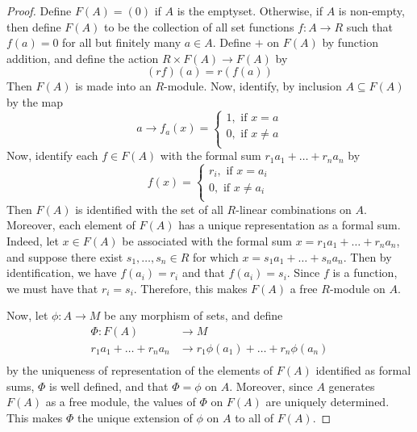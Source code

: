 \begin{proof}
  Define $F(A)=(0)$ if $A$ is the emptyset. Otherwise, if $A$ is
  non-empty, then define $F(A)$ to be the collection of all set
  functions $f:A \xrightarrow{} R$ such that $f(a)=0$ for all but
  finitely many $a \in A$. Define $+$ on $F(A)$ by function addition,
  and define the action $R \times F(A) \xrightarrow{} F(A)$ by
  \begin{equation*}
    (rf)(a)=r(f(a))
  \end{equation*}
  Then $F(A)$ is made into an $R$-module. Now, identify, by inclusion
  $A \subseteq F(A)$ by the map
  \begin{equation*}
    a \xrightarrow{} f_a(x)=
    \begin{cases}
      1, \text{ if } x=a  \\
      0, \text{ if } x \neq a \\
    \end{cases}
  \end{equation*}
  Now, identify each $f \in F(A)$ with the formal sum
  $r_1a_1+\dots+r_na_n$ by
  \begin{equation*}
    f(x)=
    \begin{cases}
      r_i, \text{ if } x=a_i  \\
      0 , \text{ if } x \neq a_i  \\
    \end{cases}
  \end{equation*}
  Then $F(A)$ is identified with the set of all $R$-linear
  combinations on $A$. Moreover, each element of $F(A)$ has a unique
  representation as a formal sum. Indeed, let $x \in F(A)$ be
  associated with the formal sum $x=r_1a_1+\dots+r_na_n$, and suppose
  there exist $s_1, \dots, s_n \in R$ for which
  $x=s_1a_1+\dots+s_na_n$. Then by identification, we have
  $f(a_i)=r_i$ and that $f(a_i)=s_i$. Since $f$ is a function, we must
  have that $r_i=s_i$. Therefore, this makes $F(A)$ a free $R$-module
  on  $A$.

  Now, let  $\phi:A \xrightarrow{} M$ be any morphism of sets, and
  define
  \begin{align*}
    \Phi: F(A) & \xrightarrow{} M \\
          r_1a_1+\dots+r_na_n & \xrightarrow{} r_1\phi(a_1)+\dots+r_n\phi(a_n) \\
  \end{align*}
  by the uniqueness of representation of the elements of $F(A)$
  identified as formal sums, $\Phi$ is well defined, and that
  $\Phi=\phi$ on $A$. Moreover, since $A$ generates  $F(A)$ as a free
  module, the values of $\Phi$ on $F(A)$ are uniquely determined. This
  makes $\Phi$ the unique extension of $\phi$ on $A$ to all of
  $F(A)$.
\end{proof}
